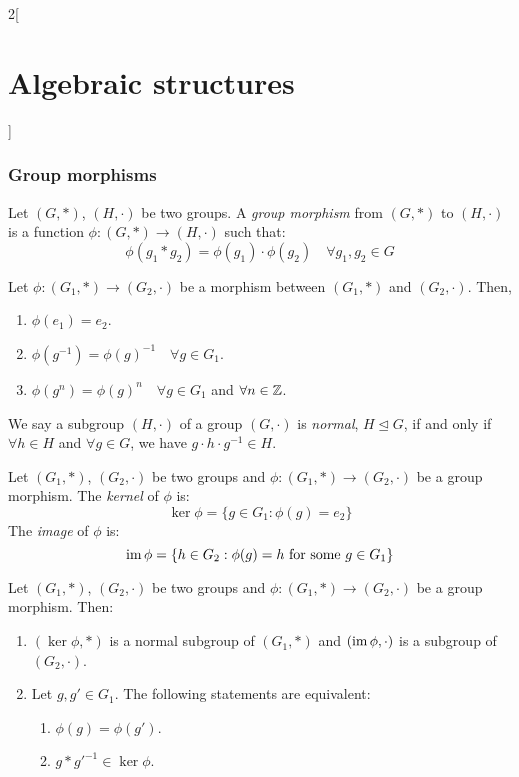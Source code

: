 \documentclass[../../../main_math.tex]{subfiles}
\begin{document}
\begin{multicols}{2}[\section{Algebraic structures}]
  \subsubsection{Group morphisms}
  \begin{definition}\label{AS_groupmorphism}
    Let $(G,*)$, $(H,\cdot)$ be two groups. A \emph{group morphism} from $(G,*)$ to $(H,\cdot)$ is a function $\phi:(G,*)\rightarrow (H,\cdot)$ such that: $$\phi(g_1*g_2)=\phi(g_1)\cdot\phi(g_2)\quad\forall g_1,g_2\in G$$
  \end{definition}
  \begin{lemma}
    Let $\phi:(G_1,*)\rightarrow (G_2,\cdot)$ be a morphism between $(G_1,*)$ and $(G_2,\cdot)$. Then,
    \begin{enumerate}
      \item $\phi(e_1)=e_2$.
      \item $\phi(g^{-1})=\phi(g)^{-1}\quad\forall g\in G_1$.
      \item $\phi(g^n)=\phi(g)^n\quad\forall g\in G_1$ and $\forall n\in\mathbb{Z} $.
    \end{enumerate}
  \end{lemma}
  \begin{definition}
    We say a subgroup $(H,\cdot)$ of a group $(G,\cdot)$ is \emph{normal}, $H\unlhd G$, if and only if $\forall h\in H$ and $\forall g\in G$, we have $g\cdot h\cdot g^{-1}\in H$.
  \end{definition}
  \begin{definition}
    Let $(G_1,*)$, $(G_2,\cdot)$ be two groups and $\phi:(G_1,*)\rightarrow (G_2,\cdot)$ be a group morphism. The \emph{kernel} of $\phi$ is: $$\ker\phi=\{g\in G_1:\phi(g)=e_2\}$$
    The \emph{image} of $\phi$ is: $$\operatorname{im}\phi=\{h\in G_2:\phi(g)=h\text{ for some }g\in G_1\}$$
  \end{definition}
  \begin{proposition}
    Let $(G_1,*)$, $(G_2,\cdot)$ be two groups and $\phi:(G_1,*)\rightarrow (G_2,\cdot)$ be a group morphism. Then:
    \begin{enumerate}
      \item $(\ker\phi,*)$ is a normal subgroup of $(G_1,*)$ and $(\operatorname{im}\phi,\cdot)$ is a subgroup of $(G_2,\cdot)$.
      \item Let $g,g'\in G_1$. The following statements are equivalent:
            \begin{enumerate}
              \item $\phi(g)=\phi(g')$.
              \item $g*g'^{-1}\in\ker\phi$.

\end{enumerate}
\end{enumerate}
\end{proposition}
\end{multicols}
\end{document}
